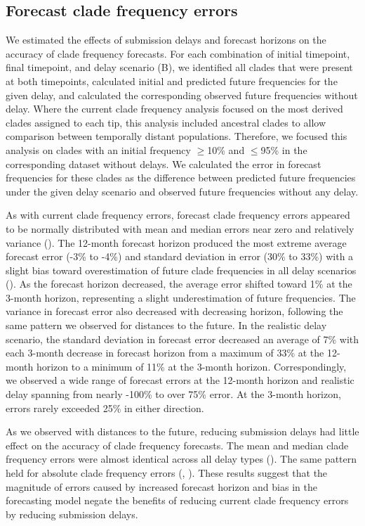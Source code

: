 \documentclass[9pt,lineno]{elife}
\begin{document}
\subsection{Forecast clade frequency errors}

We estimated the effects of submission delays and forecast horizons on the accuracy of clade frequency forecasts.
For each combination of initial timepoint, final timepoint, and delay scenario (B), we identified all clades that were present at both timepoints, calculated initial and predicted future frequencies for the given delay, and calculated the corresponding observed future frequencies without delay.
Where the current clade frequency analysis focused on the most derived clades assigned to each tip, this analysis included ancestral clades to allow comparison between temporally distant populations.
Therefore, we focused this analysis on clades with an initial frequency $\ge$10\% and $\le$95\% in the corresponding dataset without delays.
We calculated the error in forecast frequencies for these clades as the difference between predicted future frequencies under the given delay scenario and observed future frequencies without any delay.

As with current clade frequency errors, forecast clade frequency errors appeared to be normally distributed with mean and median errors near zero and relatively variance ().
The 12-month forecast horizon produced the most extreme average forecast error (-3\% to -4\%) and standard deviation in error (30\% to 33\%) with a slight bias toward overestimation of future clade frequencies in all delay scenarios ().
As the forecast horizon decreased, the average error shifted toward 1\% at the 3-month horizon, representing a slight underestimation of future frequencies.
The variance in forecast error also decreased with decreasing horizon, following the same pattern we observed for distances to the future.
In the realistic delay scenario, the standard deviation in forecast error decreased an average of 7\% with each 3-month decrease in forecast horizon from a maximum of 33\% at the 12-month horizon to a minimum of 11\% at the 3-month horizon.
Correspondingly, we observed a wide range of forecast errors at the 12-month horizon and realistic delay spanning from nearly -100\% to over 75\% error.
At the 3-month horizon, errors rarely exceeded 25\% in either direction.

As we observed with distances to the future, reducing submission delays had little effect on the accuracy of clade frequency forecasts.
The mean and median clade frequency errors were almost identical across all delay types ().
The same pattern held for absolute clade frequency errors (, ).
These results suggest that the magnitude of errors caused by increased forecast horizon and bias in the forecasting model negate the benefits of reducing current clade frequency errors by reducing submission delays.
\end{document}
